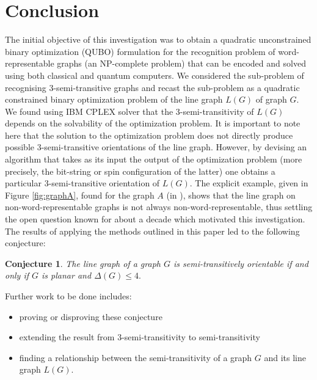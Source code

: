 \documentclass{article}
\newtheorem{conjecture}{Conjecture}
\begin{document}
\section{Conclusion}
The initial objective of this investigation was to obtain a quadratic unconstrained binary optimization (QUBO) formulation for the recognition problem of word-representable graphs (an NP-complete problem) that can be encoded and solved using both classical and quantum computers. %
We considered the sub-problem of recognising  3-semi-transitive graphs and recast the sub-problem as a quadratic constrained binary optimization problem of the line graph $L(G)$ of graph $G$. We found using IBM CPLEX solver that the 3-semi-transitivity of $L(G)$  depends on the solvability of the optimization problem. It is important to note here that the solution to the optimization problem does not directly produce possible 3-semi-transitive orientations of the line graph. However, by devising an algorithm that takes as its input the output of the optimization problem (more precisely, the bit-string or spin configuration of the latter) one obtains a particular 3-semi-transitive orientation of $L(G)$. The explicit example, given in Figure \ref{fig:graphA}, found for the graph $A$ (in \cite{COLLINS2017136}), shows that the line graph on non-word-representable graphs is not always non-word-representable, thus settling the open question known for about a decade which motivated this investigation. 
\iffalse
The results of applying the methods outlined in this paper led to the following conjecture:
\begin{conjecture}
The line graph of a graph $G$ is semi-transitively orientable if and only if $G$ is planar and $\Delta(G)\leq 4.$
\end{conjecture}
\noindent
Further work to be done includes:
\begin{itemize}
    \item proving or disproving these conjecture
    \item extending the result from 3-semi-transitivity to semi-transitivity
    \item finding a relationship between the semi-transitivity of a graph $G$ and its line graph $L(G)$.
\end{itemize}
\end{document}
